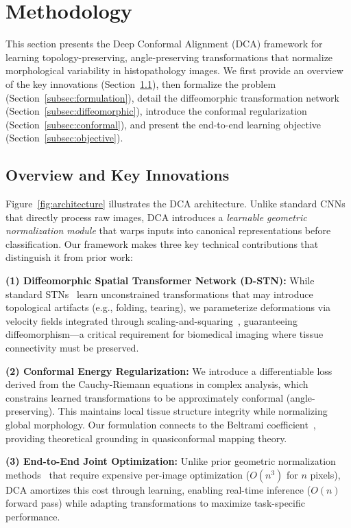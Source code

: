\section{Methodology}
\label{sec:method}

This section presents the Deep Conformal Alignment (DCA) framework for learning topology-preserving, angle-preserving transformations that normalize morphological variability in histopathology images. We first provide an overview of the key innovations (Section~\ref{subsec:overview}), then formalize the problem (Section~\ref{subsec:formulation}), detail the diffeomorphic transformation network (Section~\ref{subsec:diffeomorphic}), introduce the conformal regularization (Section~\ref{subsec:conformal}), and present the end-to-end learning objective (Section~\ref{subsec:objective}).

\subsection{Overview and Key Innovations}
\label{subsec:overview}

Figure~\ref{fig:architecture} illustrates the DCA architecture. Unlike standard CNNs that directly process raw images, DCA introduces a \textit{learnable geometric normalization module} that warps inputs into canonical representations before classification. Our framework makes three key technical contributions that distinguish it from prior work:

\textbf{(1) Diffeomorphic Spatial Transformer Network (D-STN):} While standard STNs~\cite{jaderberg2015spatial} learn unconstrained transformations that may introduce topological artifacts (e.g., folding, tearing), we parameterize deformations via velocity fields integrated through scaling-and-squaring~\cite{arsigny2006logdiff}, guaranteeing diffeomorphism---a critical requirement for biomedical imaging where tissue connectivity must be preserved.

\textbf{(2) Conformal Energy Regularization:} We introduce a differentiable loss derived from the Cauchy-Riemann equations in complex analysis, which constrains learned transformations to be approximately conformal (angle-preserving). This maintains local tissue structure integrity while normalizing global morphology. Our formulation connects to the Beltrami coefficient~\cite{beltrami_ref}, providing theoretical grounding in quasiconformal mapping theory.

\textbf{(3) End-to-End Joint Optimization:} Unlike prior geometric normalization methods~\cite{huang2024surface} that require expensive per-image optimization ($O(n^3)$ for $n$ pixels), DCA amortizes this cost through learning, enabling real-time inference ($O(n)$ forward pass) while adapting transformations to maximize task-specific performance.

